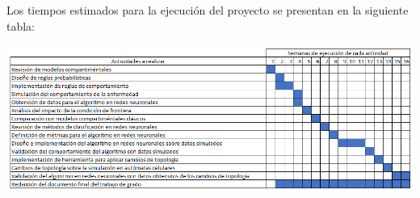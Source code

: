 
Los tiempos estimados para la ejecución del proyecto se presentan en la siguiente tabla:

\begin{center}
	\includegraphics[width=1\linewidth]{Imagenes/Cronograma}
\end{center}
